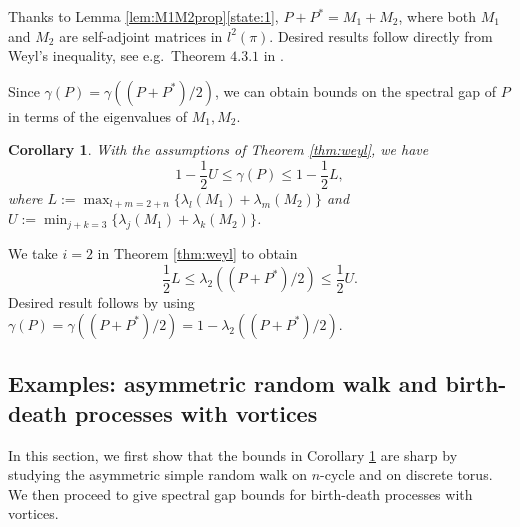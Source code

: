 \documentclass[12pt,a4]{amsart}
\numberwithin{equation}{section}
\theoremstyle{plain}
\newtheorem{corollary}{Corollary}[section]
\theoremstyle{definition}
\theoremstyle{remark}
\let\oldendproof\endproof
\renewenvironment{proof}[1][\proofname]{%
  \oldproof[\noindent\textbf{#1.} ]%
}{\oldendproof}
\newcommand{\1}{\mathds{1}}
\renewcommand{\leq}{\leqslant}
\begin{document}
\begin{proof}
	Thanks to Lemma \ref{lem:M1M2prop}\ref{state:1}, $P + P^* = M_1 + M_2$, where both $M_1$ and $M_2$ are self-adjoint matrices in $l^2(\pi)$. Desired results follow directly from Weyl's inequality, see e.g.~Theorem $4.3.1$ in \cite{HJ13}.
\end{proof}

Since $\gamma(P) = \gamma((P+P^*)/2)$, we can obtain bounds on the spectral gap of $P$ in terms of the eigenvalues of $M_1, M_2$.

\begin{corollary}\label{cor:weyl}
	With the assumptions of Theorem \ref{thm:weyl}, we have
	$$1 - \dfrac{1}{2}U \leq \gamma(P) \leq 1-\dfrac{1}{2} L,$$
	where $L := \max_{l+m = 2+n} \{\lambda_l(M_1) + \lambda_m(M_2)\}$ and $U := \min_{j+k=3} \{\lambda_j(M_1) + \lambda_k(M_2)\}$.
\end{corollary}

\begin{proof}
	We take $i = 2$ in Theorem \ref{thm:weyl} to obtain 
	$$\dfrac{1}{2} L \leq \lambda_2((P+P^*)/2) \leq \dfrac{1}{2} U.$$
	Desired result follows by using $\gamma(P) = \gamma((P+P^*)/2) = 1 - \lambda_2((P+P^*)/2)$.
\end{proof}

\subsection{Examples: asymmetric random walk and birth-death processes with vortices}

In this section, we first show that the bounds in Corollary \ref{cor:weyl} are sharp by studying the asymmetric simple random walk on $n$-cycle and on discrete torus. We then proceed to give spectral gap bounds for birth-death processes with vortices.
\end{document}

